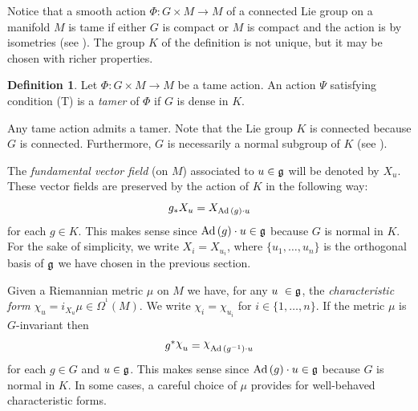 \documentclass[a4paper,oneside,10pt,reqno]{amsart}
\theoremstyle{definition}
\newtheorem{definition}[theorem]{Definition}
\newcommand\negro{\normalcolor}
\newcommand{\g}{\noindent {\mathfrak{g}}}
\newcommand{\Ad}{\mathop{\rm Ad \, } \nolimits}
\newcommand\chii{\raise2pt\hbox{$\chi$}}
\newcommand\Om{\Omega}
\newcommand{\coho}[3]{{#1}^{^{#2}}{\left( #3 \right)}}
\begin{document}
Notice that a smooth action $\Phi \colon G \times M\to M$ of a connected Lie group on a manifold $M$ is tame  if either $G$ is compact or $M$ is compact and the action is by isometries (see \cite[Theorem 1.2 of Chap. II]{MR1336823}).
The group $K$ of the definition is not unique, but it may be chosen with richer properties.

\begin{definition}
Let  $\Phi \colon G \times M\to M$ be a tame action. An action $\Psi$ satisfying  condition \textsf{(T)} is a \emph{tamer} of $\Phi$  if $G$ is dense in $K$.
\end{definition}

Any tame action
admits a tamer. Note that the Lie group $K$ is connected because $G$ is connected.
Furthermore,  $G$ is necessarily a normal subgroup of $K$ (see \cite[Proposition 1.4.1]{MR44530}). 
 

The \emph{fundamental vector field}  (on $M$) associated to $u\in \g$ will be  denoted by $X_u$.   
These vector fields are preserved by the action of $K$ in the following way:
\begin{equation}\label{Xg}
g_*X_u = X_{\Ad(g)\cdot u} 
\end{equation}
for each $g\in K$. 
   This makes sense since $\Ad(g)\cdot u \in \g$ because $G$ is normal in $K$. \negro
For the sake of  simplicity, we write $X_i = X_{u_i}$, where $\{u_1, \ldots,u_n\}$ is the orthogonal basis of $\g$ we have chosen in the previous section.


Given a Riemannian  metric $\mu$ on $M$ we have, for any $u \in \g$, the \emph{characteristic form } $\chi_u = i_{X_u} \mu\in \coho \Om1 M$. 
We write $\chi_i = \chi_{u_i}$ for $i\in \{1, \ldots,n \}$. If the metric $\mu$ is $G$-invariant then
 \begin{equation}\label{chichi}
g^*\chii_u = \chii_{\Ad(g^{-1})\cdot u}
\end{equation}
for each $g\in G$ and $u\in \g$. 
   This makes sense since $\Ad(g)\cdot u \in \g$ because $G$ is normal in $K$. \negro
 In some cases, a careful choice of $\mu$ provides for well-behaved characteristic forms.
\end{document}
